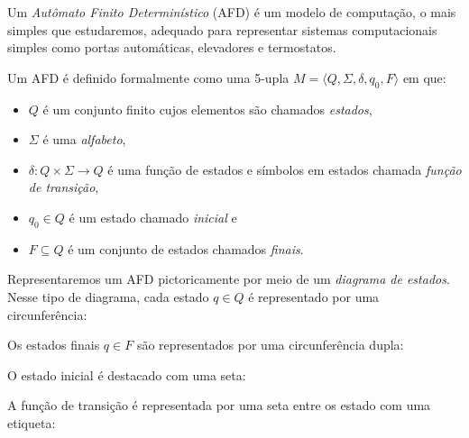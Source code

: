 Um {\em Autômato Finito Determinístico} (AFD) é um modelo de computação, o mais simples que estudaremos, adequado para representar sistemas computacionais simples como portas automáticas, elevadores e termostatos.

Um AFD é definido formalmente como uma 5-upla $M = \langle Q, \Sigma, \delta, q_0, F \rangle$ em que:
\begin{itemize}
\item[] $Q$ é um conjunto finito cujos elementos são chamados {\em estados},
\item[] $\Sigma$ é uma {\em alfabeto},
\item[] $\delta: Q \times \Sigma \to Q$ é uma função de estados e símbolos em estados chamada {\em função de transição},
\item[] $q_0 \in Q$ é um estado chamado {\em inicial} e
\item[] $F \subseteq Q$ é um conjunto de estados chamados {\em finais}.
\end{itemize}

Representaremos um AFD pictoricamente por meio de um {\em diagrama de estados}.
Nesse tipo de diagrama, cada estado $q \in Q$ é representado por uma circunferência:

\begin{center}
\end{center}

Os estados finais $q \in F$ são representados por uma circunferência dupla:

\begin{center}
\end{center}

O estado inicial é destacado com uma seta:

\begin{center}
\end{center}

A função de transição é representada por uma seta entre os estado com uma etiqueta:

